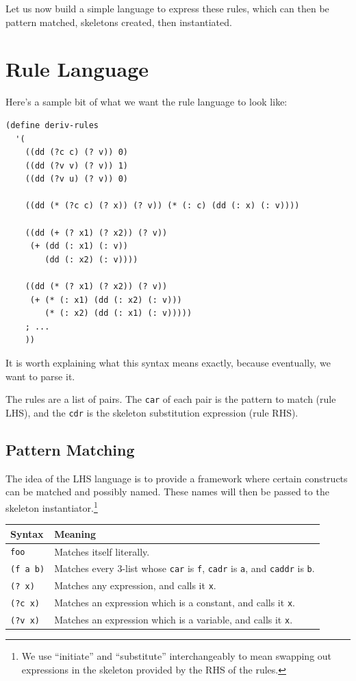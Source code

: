 \documentclass[9pt]{report}
\begin{document}
Let us now build a simple language to express these rules, which can
then be pattern matched, skeletons created, then instantiated.

\section{Rule Language}
\label{sec:orge1d0338}

Here's a sample bit of what we want the rule language to look like:

\begin{verbatim}
(define deriv-rules
  '(
    ((dd (?c c) (? v)) 0)
    ((dd (?v v) (? v)) 1)
    ((dd (?v u) (? v)) 0)

    ((dd (* (?c c) (? x)) (? v)) (* (: c) (dd (: x) (: v))))

    ((dd (+ (? x1) (? x2)) (? v))
     (+ (dd (: x1) (: v))
        (dd (: x2) (: v))))

    ((dd (* (? x1) (? x2)) (? v))
     (+ (* (: x1) (dd (: x2) (: v)))
        (* (: x2) (dd (: x1) (: v)))))
    ; ...
    ))
\end{verbatim}

It is worth explaining what this syntax means exactly, because
eventually, we want to parse it.

The rules are a list of pairs. The \texttt{car} of each pair is the
pattern to match (rule LHS), and the \texttt{cdr} is the skeleton
substitution expression (rule RHS).

\subsection{Pattern Matching}
\label{sec:org3b0b634}

The idea of the LHS language is to provide a framework where
certain constructs can be matched and possibly named. These names
will then be passed to the skeleton instantiator.\footnote{We use ``initiate'' and ``substitute'' interchangeably to mean
swapping out expressions in the skeleton provided by the RHS of the
rules.}

\begin{center}
\begin{tabular}{ll}
\toprule
Syntax & Meaning\\
\midrule
\texttt{foo} & Matches itself literally.\\
\texttt{(f a b)} & Matches every 3-list whose \texttt{car} is \texttt{f}, \texttt{cadr} is \texttt{a}, and \texttt{caddr} is \texttt{b}.\\
\texttt{(? x)} & Matches any expression, and calls it \texttt{x}.\\
\texttt{(?c x)} & Matches an expression which is a constant, and calls it \texttt{x}.\\
\texttt{(?v x)} & Matches an expression which is a variable, and calls it \texttt{x}.\\
\bottomrule
\end{tabular}
\end{center}
\end{document}
